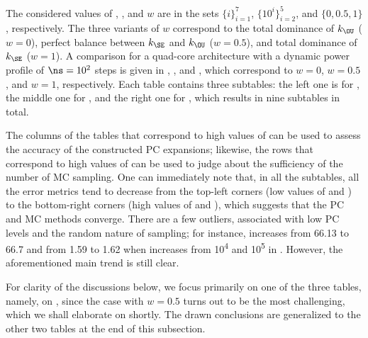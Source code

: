 The considered values of \lc, \no, and $w$ are in the sets $\{ i \}_{i = 1}^7$,
$\{ 10^i \}_{i = 2}^5$, and $\{ 0, 0.5, 1 \}$, respectively. The three variants
of $w$ correspond to the total dominance of $k_\OU$ ($w = 0$), perfect balance
between $k_\SE$ and $k_\OU$ ($w = 0.5$), and total dominance of $k_\SE$ ($w =
1$). A comparison for a quad-core architecture with a dynamic power profile of
$\ns = 10^2$ steps is given in ,
, and ,
which correspond to $w = 0$, $w = 0.5$, and $w = 1$, respectively. Each table
contains three subtables: the left one is for \error{\expectation}, the middle
one for \error{\variance}, and the right one for , which results in
nine subtables in total.

The columns of the tables that correspond to high values of \no can be used to
assess the accuracy of the constructed \ac{PC} expansions; likewise, the rows
that correspond to high values of \lc can be used to judge about the sufficiency
of the number of \ac{MC} sampling. One can immediately note that, in all the
subtables, all the error metrics tend to decrease from the top-left corners (low
values of \lc and \ns) to the bottom-right corners (high values of \lc and \ns),
which suggests that the \ac{PC} and \ac{MC} methods converge. There are a few
outliers, associated with low \ac{PC} levels and the random nature of sampling;
for instance, \error{\variance} increases from 66.13 to 66.7 and  from
1.59 to 1.62 when \no increases from 10\textsuperscript{4} and
10\textsuperscript{5} in . However, the
aforementioned main trend is still clear.

For clarity of the discussions below, we focus primarily on one of the three
tables, namely, on , since the case with $w =
0.5$ turns out to be the most challenging, which we shall elaborate on shortly.
The drawn conclusions are generalized to the other two tables at the end of this
subsection.

